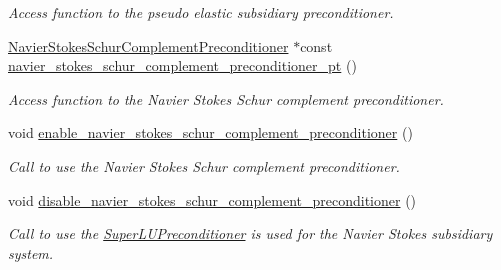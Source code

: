 \begin{DoxyCompactItemize}
\begin{DoxyCompactList}\small\item\em Access function to the pseudo elastic subsidiary preconditioner. \end{DoxyCompactList}\item 
\hyperlink{classoomph_1_1NavierStokesSchurComplementPreconditioner}{Navier\+Stokes\+Schur\+Complement\+Preconditioner} $\ast$const \hyperlink{classoomph_1_1PseudoElasticFSIPreconditioner_a4e13b64643e9026f421fa1228333ca95}{navier\+\_\+stokes\+\_\+schur\+\_\+complement\+\_\+preconditioner\+\_\+pt} ()
\begin{DoxyCompactList}\small\item\em Access function to the Navier Stokes Schur complement preconditioner. \end{DoxyCompactList}\item 
void \hyperlink{classoomph_1_1PseudoElasticFSIPreconditioner_a136fa015ebb39a20e82682bacd65c65b}{enable\+\_\+navier\+\_\+stokes\+\_\+schur\+\_\+complement\+\_\+preconditioner} ()
\begin{DoxyCompactList}\small\item\em Call to use the Navier Stokes Schur complement preconditioner. \end{DoxyCompactList}\item 
void \hyperlink{classoomph_1_1PseudoElasticFSIPreconditioner_af2adaec06d407d4b89bca034984c66ba}{disable\+\_\+navier\+\_\+stokes\+\_\+schur\+\_\+complement\+\_\+preconditioner} ()
\begin{DoxyCompactList}\small\item\em Call to use the \hyperlink{classoomph_1_1SuperLUPreconditioner}{Super\+L\+U\+Preconditioner} is used for the Navier Stokes subsidiary system. \end{DoxyCompactList}\end{DoxyCompactItemize}
